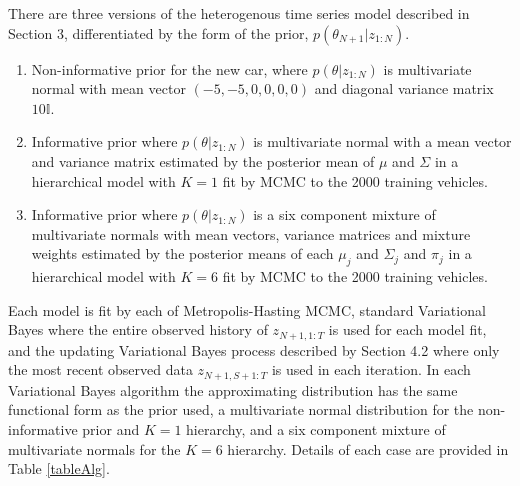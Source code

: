 \documentclass[12pt,a4paper]{article}\usepackage[]{graphicx}\usepackage[]{color}
\begin{document}
There are three versions of the heterogenous time series model described in Section 3, differentiated by the form of the prior, $p(\theta_{N+1} | z_{1:N})$.
\begin{enumerate}
\item Non-informative prior for the new car, where $p(\theta | z_{1:N})$ is multivariate normal with mean vector $(-5, -5, 0, 0, 0, 0)$ and diagonal variance matrix $10 \mathbb{I}$.
\item Informative prior where $p(\theta | z_{1:N})$ is multivariate normal with a mean vector and variance matrix estimated by the posterior mean of $\mu$ and $\Sigma$ in a hierarchical model with $K = 1$ fit by MCMC to the 2000 training vehicles. 
\item Informative prior where $p(\theta | z_{1:N})$ is a six component mixture of multivariate normals with mean vectors, variance matrices and mixture weights estimated by the posterior means of each $\mu_j$ and $\Sigma_j$ and $\pi_j$ in a hierarchical model with $K = 6$ fit by MCMC to the 2000 training vehicles. 
\end{enumerate}
Each model is fit by each of Metropolis-Hasting MCMC, standard Variational Bayes where the entire observed history of $z_{N+1, 1:T}$ is used for each model fit, and the updating Variational Bayes process described by Section 4.2 where only the most recent observed data $z_{N+1, S+1:T}$ is used in each iteration. In each Variational Bayes algorithm the approximating distribution has the same functional form as the prior used, a multivariate normal distribution for the non-informative prior and $K = 1$ hierarchy, and a six component mixture of multivariate normals for the $K = 6$ hierarchy. Details of each case are provided in Table \ref{tableAlg}.
\end{document}
